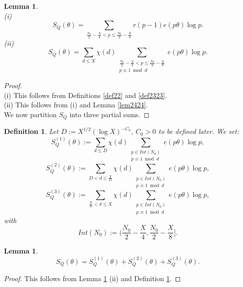 \documentclass{amsart}
\newtheorem{lemma}[theorem]{Lemma}
\numberwithin{equation}{subsection}
\newtheorem{definition}[theorem]{Definition}
\begin{document}
\begin{lemma}\label{lem2525}$ $\\
(i)
$$S_Q(\theta)=\sum_{\frac{N_0}{2}-\frac{X}{4}<p\leq \frac{N_0}{2}-\frac{X}{8}} r(p-1)e(p\theta)\log p.$$
(ii)
$$S_Q(\theta)=\sum_{d\leq X} \chi(d) \sum_{\substack{\frac{N_0}{2}-\frac{X}{4}<p\leq \frac{N_0}{2}-\frac{X}{8} \\ p\equiv 1 \bmod d}} e(p\theta)\log p.$$
\end{lemma}
\begin{proof}$ $\\
(i) This follows from Definitions \ref{def22} and \ref{def2323}.\\
(ii) This follows from (i) and Lemma \ref{lem2424}.\\
We now partition $S_Q$ into three partial sums.
\end{proof}

\begin{definition}\label{def2626}
Let $D:=X^{1/2}(\log X)^{-C_0}$, $C_0>0$ to be defined later. We set:
$$S_Q^{(1)}(\theta):=\sum_{d\leq D} \chi(d)\sum_{\substack{p\in Int(N_0)\\ p\equiv 1 \bmod d}} e(p\theta) \log p,$$
$$S_Q^{(2)}(\theta):=\sum_{D<d\leq \frac{X}{D}} \chi(d)\sum_{\substack{p\in Int(N_0)\\ p\equiv 1 \bmod d}} e(p\theta) \log p,$$
$$S_Q^{(3)}(\theta):=\sum_{\frac{X}{D}<d\leq X} \chi(d)\sum_{\substack{p\in Int(N_0)\\ p\equiv 1 \bmod d}} e(p\theta) \log p,$$
with 
$$Int(N_0):=\bigg(\frac{N_0}{2}-\frac{X}{4}, \frac{N_0}{2}-\frac{X}{8}\bigg].$$
\end{definition}

\begin{lemma}\label{lem2727}
$$S_Q(\theta)=S_Q^{(1)}(\theta)+S_Q^{(2)}(\theta)+S_Q^{(3)}(\theta).$$
\end{lemma}
\begin{proof}
This follows from Lemma \ref{lem2525} (ii) and Definition \ref{def2626}.
\end{proof}
\end{document}
